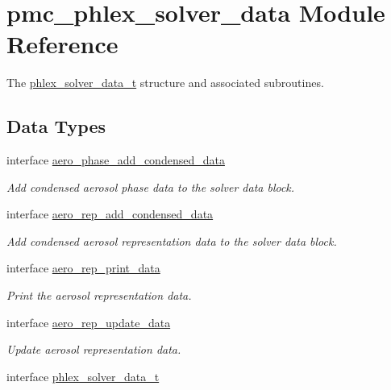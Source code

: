 \hypertarget{namespacepmc__phlex__solver__data}{}\section{pmc\+\_\+phlex\+\_\+solver\+\_\+data Module Reference}
\label{namespacepmc__phlex__solver__data}


The \mbox{\hyperlink{structpmc__phlex__solver__data_1_1phlex__solver__data__t}{phlex\+\_\+solver\+\_\+data\+\_\+t}} structure and associated subroutines.  


\subsection*{Data Types}
\begin{DoxyCompactItemize}
\item 
interface \mbox{\hyperlink{interfacepmc__phlex__solver__data_1_1aero__phase__add__condensed__data}{aero\+\_\+phase\+\_\+add\+\_\+condensed\+\_\+data}}
\begin{DoxyCompactList}\small\item\em Add condensed aerosol phase data to the solver data block. \end{DoxyCompactList}\item 
interface \mbox{\hyperlink{interfacepmc__phlex__solver__data_1_1aero__rep__add__condensed__data}{aero\+\_\+rep\+\_\+add\+\_\+condensed\+\_\+data}}
\begin{DoxyCompactList}\small\item\em Add condensed aerosol representation data to the solver data block. \end{DoxyCompactList}\item 
interface \mbox{\hyperlink{interfacepmc__phlex__solver__data_1_1aero__rep__print__data}{aero\+\_\+rep\+\_\+print\+\_\+data}}
\begin{DoxyCompactList}\small\item\em Print the aerosol representation data. \end{DoxyCompactList}\item 
interface \mbox{\hyperlink{interfacepmc__phlex__solver__data_1_1aero__rep__update__data}{aero\+\_\+rep\+\_\+update\+\_\+data}}
\begin{DoxyCompactList}\small\item\em Update aerosol representation data. \end{DoxyCompactList}\item 
interface \mbox{\hyperlink{structpmc__phlex__solver__data_1_1phlex__solver__data__t}{phlex\+\_\+solver\+\_\+data\+\_\+t}}

\end{DoxyCompactItemize}
